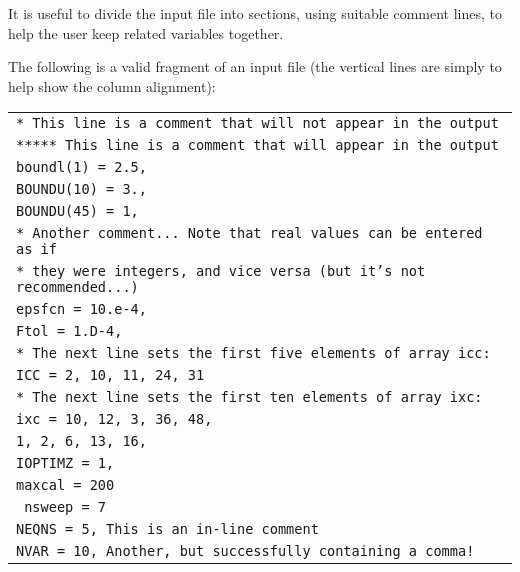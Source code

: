 It is useful to divide the input file into sections, using suitable comment
lines, to help the user keep related variables together.

The following is a valid fragment of an input file (the vertical lines are
simply to help show the column alignment):
\begin{center}
\begin{tabular}{||l}
$\!\!$\texttt{* This line is a comment that will not appear in the output} \\
$\!\!$\texttt{***** This line is a comment that will appear in the output} \\
$\!\!$\texttt{boundl(1) = 2.5,} \\
$\!\!$\texttt{BOUNDU(10) = 3.,} \\
$\!\!$\texttt{BOUNDU(45) = 1,} \\
$\!\!$\texttt{* Another comment... Note that real values can be entered as if} \\
$\!\!$\texttt{* they were integers, and vice versa (but it's not recommended...)} \\
$\!\!$\texttt{epsfcn = 10.e-4,} \\
$\!\!$\texttt{Ftol = 1.D-4,} \\
$\!\!$\texttt{* The next line sets the first five elements of array icc:} \\
$\!\!$\texttt{ICC =   2, 10, 11, 24, 31} \\
$\!\!$\texttt{* The next line sets the first ten elements of array ixc:} \\
$\!\!$\texttt{ixc =   10, 12, 3, 36, 48,} \\
$\!\!$\hspace{15mm}\texttt{1, 2, 6, 13, 16,} \\
$\!\!$\texttt{IOPTIMZ = 1,} \\
$\!\!$\texttt{maxcal = 200} \\
$\!\!$\texttt{ nsweep = 7} \\
$\!\!$\texttt{NEQNS = 5,    This is an in-line comment} \\
$\!\!$\texttt{NVAR = 10,    Another, but successfully containing a comma!} \\
\end{tabular}
\end{center}

